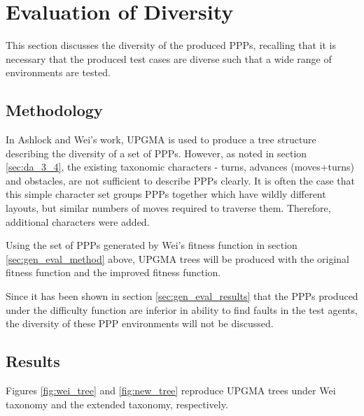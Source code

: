\documentclass[authoryearcitations]{UoYCSproject}
\begin{document}
\section{Evaluation of Diversity}
\label{sec:div_eval}
This section discusses the diversity of the produced PPPs, recalling that it is necessary that the produced test cases are diverse such that a wide range of environments are tested.

\subsection{Methodology}
\label{sec:div_eval_method}
In Ashlock and Wei's work, UPGMA is used to produce a tree structure describing the diversity of a set of PPPs. However, as noted in section \ref{sec:da_3_4}, the existing taxonomic characters - turns, advances (moves+turns) and obstacles, are not sufficient to describe PPPs clearly. It is often the case that this simple character set groups PPPs together which have wildly different layouts, but similar numbers of moves required to traverse them. Therefore, additional characters were added.

Using the set of PPPs generated by Wei's fitness function in section \ref{sec:gen_eval_method} above, UPGMA trees will be produced with the original fitness function and the improved fitness function.

Since it has been shown in section \ref{sec:gen_eval_results} that the PPPs produced under the difficulty function are inferior in ability to find faults in the test agents, the diversity of these PPP environments will not be discussed.

\subsection{Results}
\label{sec:div_eval_res}
Figures \ref{fig:wei_tree} and \ref{fig:new_tree} reproduce UPGMA trees under Wei taxonomy and the extended taxonomy, respectively. 
\end{document}
